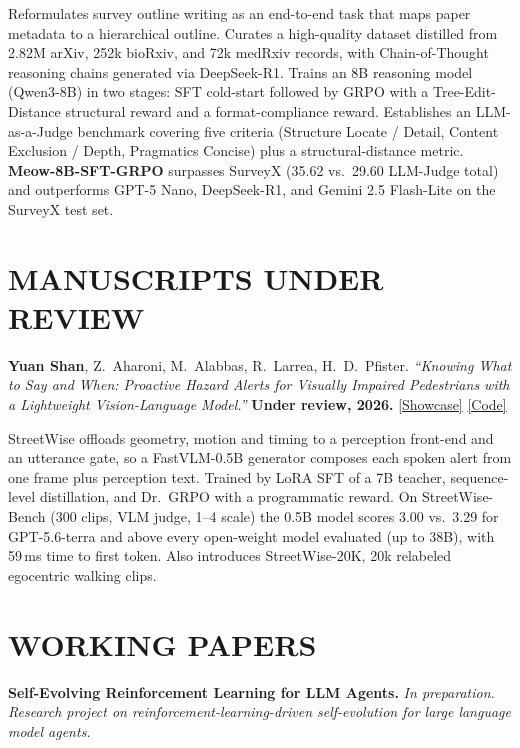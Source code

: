 \documentclass[11pt,letterpaper]{article}
\begin{document}
\vspace{4pt}
{\small\color{muted}
Reformulates survey outline writing as an end-to-end task that maps paper metadata to a hierarchical outline. Curates a high-quality dataset distilled from 2.82M arXiv, 252k bioRxiv, and 72k medRxiv records, with Chain-of-Thought reasoning chains generated via DeepSeek-R1. Trains an 8B reasoning model (Qwen3-8B) in two stages: SFT cold-start followed by GRPO with a Tree-Edit-Distance structural reward and a format-compliance reward. Establishes an LLM-as-a-Judge benchmark covering five criteria (Structure Locate / Detail, Content Exclusion / Depth, Pragmatics Concise) plus a structural-distance metric. \textbf{Meow-8B-SFT-GRPO} surpasses SurveyX (35.62 vs.\ 29.60 LLM-Judge total) and outperforms GPT-5 Nano, DeepSeek-R1, and Gemini 2.5 Flash-Lite on the SurveyX test set.}

\section{MANUSCRIPTS UNDER REVIEW}

\noindent
\textbf{\color{ink}Yuan Shan}, Z.~Aharoni, M.~Alabbas, R.~Larrea, H.~D.~Pfister.
\textit{``Knowing What to Say and When: Proactive Hazard Alerts for Visually Impaired Pedestrians with a Lightweight Vision-Language Model.''}
\textbf{Under review, 2026.}
\;\href{https://cedricshan.github.io/streetwise/}{[Showcase]} \;\href{https://anonymous.4open.science/r/streetwise-B7E9}{[Code]}

\vspace{4pt}
{\small\color{muted}
StreetWise offloads geometry, motion and timing to a perception front-end and an utterance gate, so a FastVLM-0.5B generator composes each spoken alert from one frame plus perception text. Trained by LoRA SFT of a 7B teacher, sequence-level distillation, and Dr.~GRPO with a programmatic reward. On StreetWise-Bench (300 clips, VLM judge, 1--4 scale) the 0.5B model scores 3.00 vs.\ 3.29 for GPT-5.6-terra and above every open-weight model evaluated (up to 38B), with 59\,ms time to first token. Also introduces StreetWise-20K, 20k relabeled egocentric walking clips.}

\section{WORKING PAPERS}

\noindent
\textbf{\color{ink}Self-Evolving Reinforcement Learning for LLM Agents.} \textit{In preparation.}\\[2pt]
{\small\color{muted}\itshape Research project on reinforcement-learning-driven self-evolution for large language model agents.}
\end{document}
